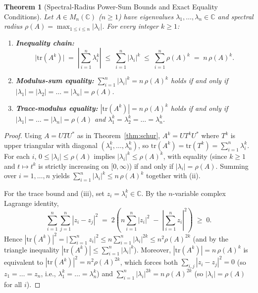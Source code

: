 \documentclass[11pt,a4paper]{article}
\theoremstyle{plain}
\newtheorem{theorem}{Theorem}[section]
\theoremstyle{definition}
\newcommand{\C}{\mathbb{C}}
\newcommand{\tr}{\mathrm{tr}}
\begin{document}
\begin{theorem}[Spectral-Radius Power-Sum Bounds and Exact Equality Conditions]\label{thm:spectral-bounds}
Let $A \in M_n(\C)$ ($n \ge 1$) have eigenvalues $\lambda_1, \dots, \lambda_n \in \C$ and spectral radius $\rho(A) = \max_{1 \le i \le n} |\lambda_i|$. For every integer $k \ge 1$:
\begin{enumerate}
  \item[(i)] \textbf{Inequality chain:}
  \begin{equation}\label{eq:spec-chain}
    \bigl|\tr(A^k)\bigr| \;=\; \left|\sum_{i=1}^n \lambda_i^k\right| \;\le\; \sum_{i=1}^n |\lambda_i|^k \;\le\; \sum_{i=1}^n \rho(A)^k \;=\; n\,\rho(A)^k.
  \end{equation}
  \item[(ii)] \textbf{Modulus-sum equality:} $\sum_{i=1}^n |\lambda_i|^k = n\,\rho(A)^k$ holds if and only if $|\lambda_1| = |\lambda_2| = \dots = |\lambda_n| = \rho(A)$.
  \item[(iii)] \textbf{Trace-modulus equality:} $|\tr(A^k)| = n\,\rho(A)^k$ holds if and only if $|\lambda_1| = \dots = |\lambda_n| = \rho(A)$ and $\lambda_1^k = \lambda_2^k = \dots = \lambda_n^k$.
\end{enumerate}
\end{theorem}

\begin{proof}
Using $A = U T U^*$ as in Theorem~\ref{thm:schur}, $A^k = U T^k U^*$ where $T^k$ is upper triangular with diagonal $(\lambda_1^k, \dots, \lambda_n^k)$, so $\tr(A^k) = \tr(T^k) = \sum_{i=1}^n \lambda_i^k$. For each $i$, $0 \le |\lambda_i| \le \rho(A)$ implies $|\lambda_i|^k \le \rho(A)^k$, with equality (since $k \ge 1$ and $t \mapsto t^k$ is strictly increasing on $[0,\infty)$) if and only if $|\lambda_i| = \rho(A)$. Summing over $i = 1, \dots, n$ yields $\sum_{i=1}^n |\lambda_i|^k \le n\,\rho(A)^k$ together with (ii).

For the trace bound and (iii), set $z_i = \lambda_i^k \in \C$. By the $n$-variable complex Lagrange identity,
\begin{equation}\label{eq:lagrange}
  \sum_{i=1}^n \sum_{j=1}^n |z_i - z_j|^2 \;=\; 2\left(n \sum_{i=1}^n |z_i|^2 \;-\; \left|\sum_{i=1}^n z_i\right|^2\right) \;\ge\; 0.
\end{equation}
Hence $|\tr(A^k)|^2 = \bigl|\sum_{i=1}^n z_i\bigr|^2 \le n \sum_{i=1}^n |\lambda_i|^{2k} \le n^2 \rho(A)^{2k}$ (and by the triangle inequality $|\tr(A^k)| \le \sum_{i=1}^n |\lambda_i|^k$). Moreover, $|\tr(A^k)| = n\,\rho(A)^k$ is equivalent to $|\tr(A^k)|^2 = n^2 \rho(A)^{2k}$, which forces both $\sum_{i,j} |z_i - z_j|^2 = 0$ (so $z_1 = \dots = z_n$, i.e., $\lambda_1^k = \dots = \lambda_n^k$) and $\sum_{i=1}^n |\lambda_i|^{2k} = n\,\rho(A)^{2k}$ (so $|\lambda_i| = \rho(A)$ for all $i$).
\end{proof}
\end{document}
